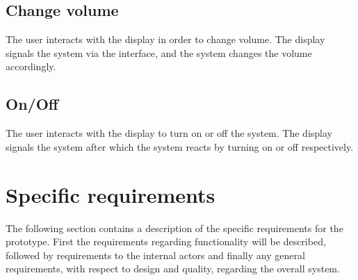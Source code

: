 \subsection{Change volume}
The user interacts with the display in order to change volume. The display signals the system via the interface, and the system changes the volume accordingly.

\subsection{On/Off}
The user interacts with the display to turn on or off the system. The display signals the system after which the system reacts by turning on or off respectively. 

\section{Specific requirements}
The following section contains a description of the specific requirements for the prototype. First the requirements regarding functionality will be described, followed by requirements to the internal actors and finally any general requirements, with respect to design and quality, regarding the overall system.

